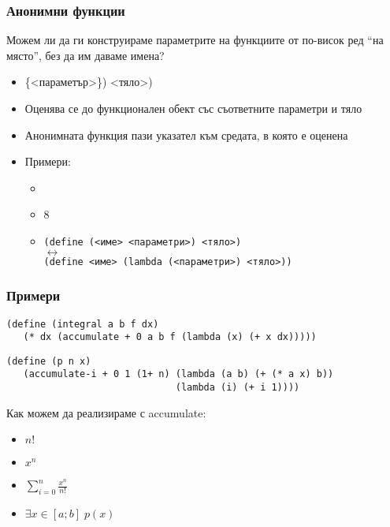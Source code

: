 \documentclass{beamer}
\begin{document}
\begin{frame}
  \frametitle{Анонимни функции}

  Можем ли да ги конструираме параметрите на функциите от по-висок ред ``на място'', без да им даваме имена?
  \vspace{0.5em}

  \pause
  \begin{itemize}[<+->]
  \item {}\{<параметър>\}\tta) <тяло>\tta)
  \item Оценява се до функционален обект със съответните параметри и тяло
  \item \alert{Анонимната функция пази указател към средата, в която е оценена}
  \item Примери:
    \begin{itemize}
    \item {}
    \item {}8
    \item
        \tt{(define (}<име> <параметри>\tt) <тяло>\tt)\\
        $\longleftrightarrow$\\
        \tt{(define }<име> \tt{(lambda (}<параметри>\tt) <тяло>\tt{))}
    \end{itemize}
  \end{itemize}
\end{frame}

\begin{frame}[fragile]
  \frametitle{Примери}

\begin{verbatim}
(define (integral a b f dx)
   (* dx (accumulate + 0 a b f (lambda (x) (+ x dx)))))
\end{verbatim}

\pause

\begin{verbatim}
(define (p n x)
   (accumulate-i + 0 1 (1+ n) (lambda (a b) (+ (* a x) b))
                              (lambda (i) (+ i 1))))
\end{verbatim}

\pause

Как можем да реализираме с accumulate:
\begin{itemize}
\item $n!$
\item $x^n$
\item $\sum_{i=0}^n \frac{x^n}{n!}$
\item $\exists x\in[a;b]\; p(x)$
\end{itemize}
\end{frame}
\end{document}
